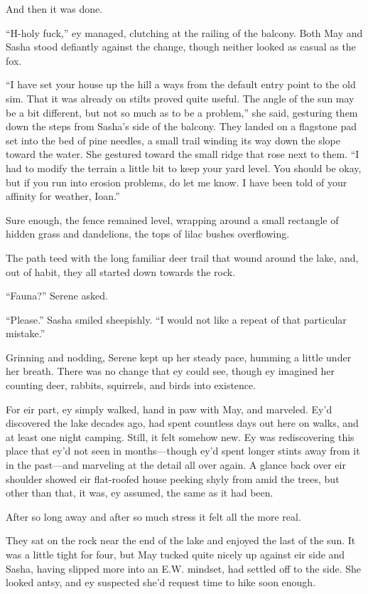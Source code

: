 And then it was done.

``H-holy fuck,'' ey managed, clutching at the railing of the balcony. Both May and Sasha stood defiantly against the change, though neither looked as casual as the fox.

``I have set your house up the hill a ways from the default entry point to the old sim. That it was already on stilts proved quite useful. The angle of the sun may be a bit different, but not so much as to be a problem,'' she said, gesturing them down the steps from Sasha's side of the balcony. They landed on a flagstone pad set into the bed of pine needles, a small trail winding its way down the slope toward the water. She gestured toward the small ridge that rose next to them. ``I had to modify the terrain a little bit to keep your yard level. You should be okay, but if you run into erosion problems, do let me know. I have been told of your affinity for weather, Ioan.''

Sure enough, the fence remained level, wrapping around a small rectangle of hidden grass and dandelions, the tops of lilac bushes overflowing.

The path teed with the long familiar deer trail that wound around the lake, and, out of habit, they all started down towards the rock.

``Fauna?'' Serene asked.

``Please.'' Sasha smiled sheepishly. ``I would not like a repeat of that particular mistake.''

Grinning and nodding, Serene kept up her steady pace, humming a little under her breath. There was no change that ey could see, though ey imagined her counting deer, rabbits, squirrels, and birds into existence.

For eir part, ey simply walked, hand in paw with May, and marveled. Ey'd discovered the lake decades ago, had spent countless days out here on walks, and at least one night camping. Still, it felt somehow new. Ey was rediscovering this place that ey'd not seen in months—though ey'd spent longer stints away from it in the past—and marveling at the detail all over again. A glance back over eir shoulder showed eir flat-roofed house peeking shyly from amid the trees, but other than that, it was, ey assumed, the same as it had been.

After so long away and after so much stress it felt all the more real.

They sat on the rock near the end of the lake and enjoyed the last of the sun. It was a little tight for four, but May tucked quite nicely up against eir side and Sasha, having slipped more into an E.W. mindset, had settled off to the side. She looked antsy, and ey suspected she'd request time to hike soon enough.

